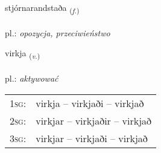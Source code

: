 \documentclass[frontgrid, backgrid]{flacards}\usepackage[]{graphicx}\usepackage[]{xcolor}
\begin{document}
\renewcommand{\blhead}{\vskip5pt {\small\bfseries\footnotesize Nafnorð | rzeczownik }}
\renewcommand{\bcfoot}{\vskip5pt \hspace{2pt}{\small\bfseries\footnotesize 3K}}


{stjórnarandstaða \small{\textsubscript{(\textit{f.})}} \\[1ex] %
\textphonetic{[stjourtnarantstaða]} \\
pl.: \emph{opozycja, przeciwieństwo} \\  [2ex]
\renewcommand*{\arraystretch}{0.8}
}

\renewcommand{\flhead}{\vskip5pt \fboxsep=0pt {\small\bfseries\footnotesize Sagnorð | czasownik}}
\renewcommand{\fcfoot}{\vskip5pt \fboxsep=0pt \hspace{2pt}{\small\bfseries\footnotesize 3K}}

\renewcommand{\blhead}{\vskip5pt {\small\bfseries\footnotesize Sagnorð | czasownik }}
\renewcommand{\bcfoot}{\vskip5pt \hspace{2pt}{\small\bfseries\footnotesize 3K}}


{virkja \small{\textsubscript{(\textit{v.})}} \\[1ex] %
\textphonetic{[vɪr̥ca]} \\
pl.: \emph{aktywować} \\  [2ex]
\renewcommand*{\arraystretch}{0.8}
\begin{tabular}{p{1cm}l}
\textsc{1sg}: & virkja -- virkjaði -- virkjað \\ 
\textsc{2sg}: & virkjar -- virkjaðir -- virkjað \\ 
\textsc{3sg}: & virkjar -- virkjaði -- virkjað \\ 
\end{tabular}
}
\end{document}

